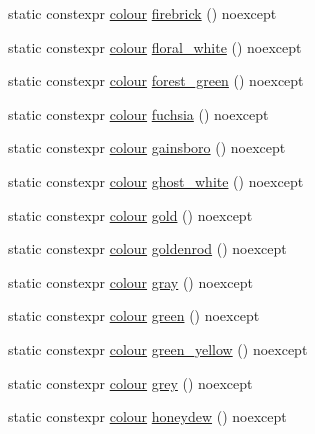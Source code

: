 \begin{DoxyCompactItemize}
static constexpr \mbox{\hyperlink{classmoka_1_1colour}{colour}} \mbox{\hyperlink{classmoka_1_1colour_ace02c8f9aca135461aacccc6a7774d9e}{firebrick}} () noexcept
\item 
static constexpr \mbox{\hyperlink{classmoka_1_1colour}{colour}} \mbox{\hyperlink{classmoka_1_1colour_a4cd964a1fab43bf0c7bb3d007428d043}{floral\+\_\+white}} () noexcept
\item 
static constexpr \mbox{\hyperlink{classmoka_1_1colour}{colour}} \mbox{\hyperlink{classmoka_1_1colour_ad3f3234e6667e4d9eb33bcf8ea082df1}{forest\+\_\+green}} () noexcept
\item 
static constexpr \mbox{\hyperlink{classmoka_1_1colour}{colour}} \mbox{\hyperlink{classmoka_1_1colour_ac20a5ec45c83c8bbc89fdec5fcb3fc29}{fuchsia}} () noexcept
\item 
static constexpr \mbox{\hyperlink{classmoka_1_1colour}{colour}} \mbox{\hyperlink{classmoka_1_1colour_a7c5975a37f7aa5bbbdfc4abc78002552}{gainsboro}} () noexcept
\item 
static constexpr \mbox{\hyperlink{classmoka_1_1colour}{colour}} \mbox{\hyperlink{classmoka_1_1colour_a599a544493ece8acc2ee62bdd2604e0e}{ghost\+\_\+white}} () noexcept
\item 
static constexpr \mbox{\hyperlink{classmoka_1_1colour}{colour}} \mbox{\hyperlink{classmoka_1_1colour_a7827508c0ecde383148625dc72c355d9}{gold}} () noexcept
\item 
static constexpr \mbox{\hyperlink{classmoka_1_1colour}{colour}} \mbox{\hyperlink{classmoka_1_1colour_ab65b1a933564a789803b5db12cc6a752}{goldenrod}} () noexcept
\item 
static constexpr \mbox{\hyperlink{classmoka_1_1colour}{colour}} \mbox{\hyperlink{classmoka_1_1colour_a46a3131f856463932995c8ef2b49ac29}{gray}} () noexcept
\item 
static constexpr \mbox{\hyperlink{classmoka_1_1colour}{colour}} \mbox{\hyperlink{classmoka_1_1colour_a4819e4a97e8f14db03406a3944db843c}{green}} () noexcept
\item 
static constexpr \mbox{\hyperlink{classmoka_1_1colour}{colour}} \mbox{\hyperlink{classmoka_1_1colour_a637f81ba82ccaec1cd6fc6a52f707d80}{green\+\_\+yellow}} () noexcept
\item 
static constexpr \mbox{\hyperlink{classmoka_1_1colour}{colour}} \mbox{\hyperlink{classmoka_1_1colour_a362aa56326932673cafebb0253545a40}{grey}} () noexcept
\item 
static constexpr \mbox{\hyperlink{classmoka_1_1colour}{colour}} \mbox{\hyperlink{classmoka_1_1colour_a0f335fdc74d79479b429174aa01233f8}{honeydew}} () noexcept

\end{DoxyCompactItemize}
